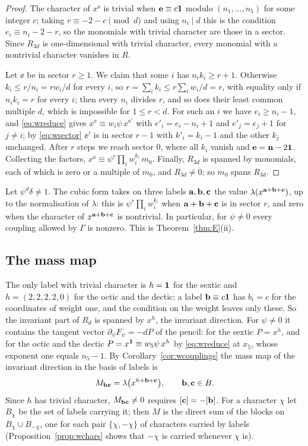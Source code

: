 \begin{proof}
The character of $x^{\ee}$ is trivial when $\mathbf{e}\equiv c\mathbf{1}$ modulo
$(n_1,\dots,n_5)$ for some integer $c$; taking $r\equiv-2-c\pmod d$ and
using $n_i\mid d$ this is the condition $e_i\equiv n_i-2-r$, so the
monomials with trivial character are those in a sector. Since $R_{3d}$ is
one-dimensional with trivial character, every monomial with a nontrivial
character vanishes in $R$.

Let $\ee$ be in sector $r\ge1$. We claim that some $i$ has $n_ik_i\ge
r+1$. Otherwise $k_i\le r/n_i=rw_i/d$ for every $i$, so $r=\sum_ik_i\le
r\sum_iw_i/d=r$, with equality only if $n_ik_i=r$ for every $i$; then every
$n_i$ divides $r$, and so does their least common multiple $d$, which is
impossible for $1\le r<d$. For such an $i$ we have $e_i\ge n_i-1$, and
\eqref{eq:wreduce} gives $x^{\ee}\equiv w_i\psi\,x^{\ee'}$ with
$e'_i=e_i-n_i+1$ and $e'_j=e_j+1$ for $j\ne i$; by \eqref{eq:wsector}
$\ee'$ is in sector $r-1$ with $k'_i=k_i-1$ and the other $k_j$ unchanged.
After $r$ steps we reach sector $0$, where all $k_i$ vanish and
$\mathbf{e}=\mathbf n-2\mathbf{1}$. Collecting the factors,
$x^{\ee}\equiv\psi^r\prod_iw_i^{k_i}\,m_0$. Finally, $R_{3d}$ is spanned
by monomials, each of which is zero or a multiple of $m_0$, and
$R_{3d}\ne0$; so $m_0$ spans $R_{3d}$.
\end{proof}

\begin{corollary}\label{cor:wcouplings}
Let $\psi^d\delta\ne1$. The cubic form takes on three labels
$\mathbf{a},\mathbf{b},\mathbf{c}$ the value $\lambda(x^{\mathbf{a}+\mathbf{b}+\mathbf{c}})$, up to the normalisation
of $\lambda$: this is $\psi^r\prod_iw_i^{k_i}$ when $\mathbf{a}+\mathbf{b}+\mathbf{c}$ is in
sector $r$, and zero when the character of $x^{\mathbf{a}+\mathbf{b}+\mathbf{c}}$ is
nontrivial. In particular, for $\psi\ne0$ every coupling allowed by
$\Gamma$ is nonzero. This is Theorem~\ref{thm:E}(ii).
\end{corollary}

\subsection{The mass map}

The only label with trivial character is $h=\mathbf{1}$ for the sextic and
$h=(2,2,2,2,0)$ for the octic and the dectic: a label $\mathbf{b}\equiv c\mathbf{1}$ has
$b_i=c$ for the coordinates of weight one, and the condition on the weight
leaves only these. So the invariant part of $R_d$ is spanned by $x^h$,
the invariant direction. For $\psi\ne0$ it contains the tangent vector
$\partial_\psi F_\psi=-dP$ of the pencil: for the sextic $P=x^h$, and for
the octic and the dectic $P=x^{\mathbf{1}}\equiv w_5\psi\,x^h$ by
\eqref{eq:wreduce} at $x_5$, whose exponent one equals $n_5-1$. By
Corollary~\ref{cor:wcouplings} the mass map of the invariant direction in
the basis of labels is
\[
M_{\mathbf{b}\mathbf{c}}=\lambda\big(x^{h+\mathbf{b}+\mathbf{c}}\big),\qquad \mathbf{b},\mathbf{c}\in B .
\]
Since $h$ has trivial character, $M_{\mathbf{b}\mathbf{c}}\ne0$ requires
$[\mathbf{c}]=-[\mathbf{b}]$. For a character $\chi$ let $B_\chi$ be the set of labels
carrying it; then $M$ is the direct sum of the blocks on
$B_\chi\cup B_{-\chi}$, one for each pair $\{\chi,-\chi\}$ of characters
carried by labels (Proposition~\ref{prop:wchars} shows that $-\chi$ is
carried whenever $\chi$ is).

